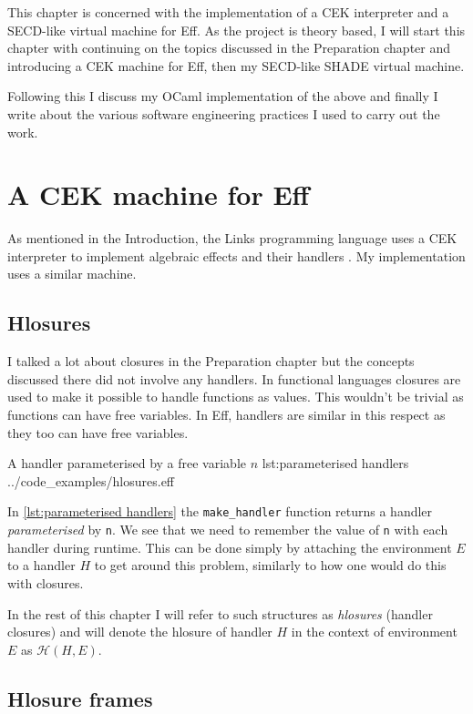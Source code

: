 \documentclass[class=article, crop=false]{standalone}
\begin{document}
This chapter is concerned with the implementation of a CEK interpreter and
a SECD-like virtual machine for Eff. As the project is theory based, I will start this chapter
with continuing on the topics discussed in the Preparation chapter and introducing a CEK machine for Eff, then my SECD-like
SHADE virtual machine.

Following this I discuss my OCaml implementation of the above and finally I write about the various 
software engineering practices I used to carry out the work.

\section{A CEK machine for Eff}

As mentioned in the Introduction, the Links programming language uses a CEK interpreter
to implement algebraic effects and their handlers \cite{hillerstrom2016compilation}.
My implementation uses a similar machine.

\subsection{Hlosures}

I talked a lot about closures in the Preparation chapter but the concepts discussed there
did not involve any handlers. In functional languages closures are used to make it possible
to handle functions as values. This wouldn't be trivial as functions can have free variables.
In Eff, handlers are similar in this respect as they too can have free variables.

{A handler parameterised by a free variable $n$}
{lst:parameterised handlers}
{../code_examples/hlosures.eff}

In \autoref{lst:parameterised handlers} the \verb|make_handler| function returns a handler
\emph{parameterised} by \verb|n|. We see that we need to remember the value of \verb|n|
with each handler during runtime. This can be done simply by attaching the environment $E$
to a handler $H$ to get around this problem, similarly to how one would do this with closures.

In the rest of this chapter I will refer to such structures as \emph{hlosures} (handler closures)
and will denote the hlosure of handler $H$ in the context of environment $E$ as $\mathcal{H}(H, E)$.

\subsection{Hlosure frames}
\end{document}
